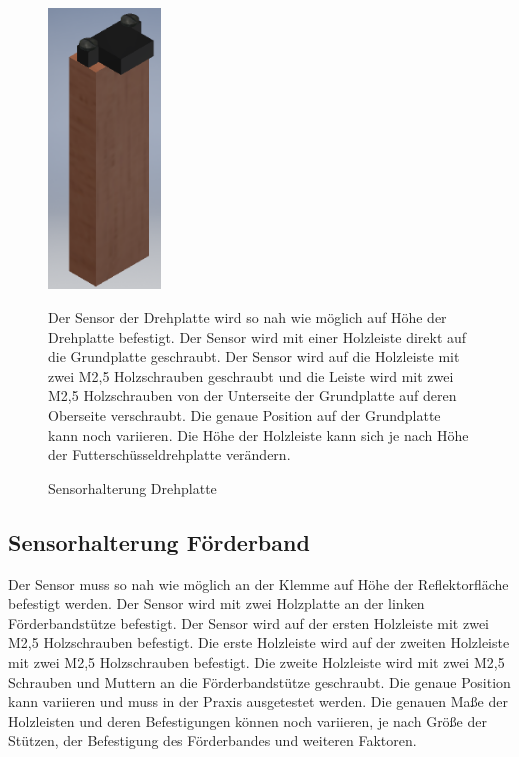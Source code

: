 \begin{figure}[H]
\begin{minipage}[t]{6cm}
\vspace{0pt}
\centering
\includegraphics[width=3cm]{Bilder/Inventor/Sensorhalterung_Drehplatte}
\caption{Sensorhalterung Drehplatte}
\label{Sens_Dreh}
\end{minipage}
\hfill
\begin{minipage}[t]{12cm}
\vspace{0pt}
Der Sensor der Drehplatte wird so nah wie möglich auf Höhe der Drehplatte befestigt. Der Sensor wird mit einer Holzleiste direkt auf die Grundplatte geschraubt. Der Sensor wird auf die Holzleiste mit zwei M2,5 Holzschrauben geschraubt und die Leiste wird mit zwei M2,5 Holzschrauben von der Unterseite der Grundplatte auf deren Oberseite verschraubt. Die genaue Position auf der Grundplatte kann noch variieren. Die Höhe der Holzleiste kann sich je nach Höhe der Futterschüsseldrehplatte verändern.
\end{minipage}
\end{figure}
\subsection{Sensorhalterung Förderband}
Der Sensor muss so nah wie möglich an der Klemme auf Höhe der Reflektorfläche befestigt werden. Der Sensor wird mit zwei Holzplatte an der linken Förderbandstütze befestigt. Der Sensor wird auf der ersten Holzleiste mit zwei M2,5 Holzschrauben befestigt. Die erste Holzleiste wird auf der zweiten Holzleiste mit zwei M2,5 Holzschrauben befestigt. Die zweite Holzleiste wird mit zwei M2,5 Schrauben und Muttern an die Förderbandstütze geschraubt. Die genaue Position kann variieren und muss in der Praxis ausgetestet werden. Die genauen Maße der Holzleisten und deren Befestigungen können noch variieren, je nach Größe der Stützen, der Befestigung des Förderbandes und weiteren Faktoren.

